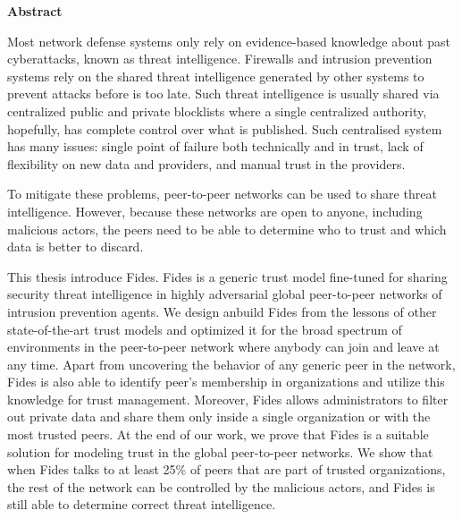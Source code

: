 \newenvironment{abstractpage}
  {\cleardoublepage\thispagestyle{empty}}
  {\vfill\cleardoublepage}
\newenvironment{abstract}[1]
  {\bigskip
   \begin{center}\bfseries#1\end{center}\small\leftskip=0.5cm\rightskip=0.5cm}
  {\par\bigskip}

\providecommand{\keywords}[2]{\footnotesize\textbf{\textit{#1:}} #2}

\begin{abstractpage}
\begin{abstract}{Abstract}

Most network defense systems only rely on evidence-based knowledge about past cyberattacks, known as threat intelligence. Firewalls and intrusion prevention systems rely on the shared threat intelligence generated by other systems to prevent attacks before is too late.
Such threat intelligence is usually shared via centralized public and private blocklists where a single centralized authority, hopefully, has complete control over what is published. Such centralised system has many issues: single point of failure both technically and in trust, lack of flexibility on new data and providers, and manual trust in the providers.

To mitigate these problems, peer-to-peer networks can be used to share threat intelligence. However, because these networks are open to anyone, including malicious actors, the peers need to be able to determine who to trust and which data is better to discard.

This thesis introduce Fides. Fides is a generic trust model fine-tuned for sharing security threat intelligence in highly adversarial global peer-to-peer networks of intrusion prevention agents.
We design anbuild Fides from the lessons of other state-of-the-art trust models and optimized it for the broad spectrum of environments in the peer-to-peer network where anybody can join and leave at any time.
Apart from uncovering the behavior of any generic peer in the network, Fides is also able to identify peer's membership in organizations and utilize this knowledge for trust management.
Moreover, Fides allows administrators to filter out private data and share them only inside a single organization or with the most trusted peers. 
At the end of our work, we prove that Fides is a suitable solution for modeling trust in the global peer-to-peer networks. We show that when Fides talks to at least 25\% of peers that are part of trusted organizations, the rest of the network can be controlled by the malicious actors, and Fides is still able to determine correct threat intelligence.


\end{abstract}
\end{abstractpage}
